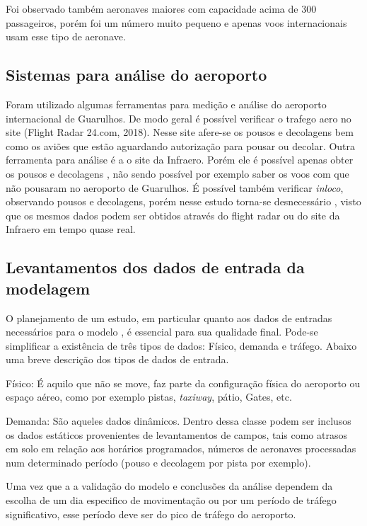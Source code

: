 \documentclass[12pt]{article}
\begin{document}
  Foi observado também aeronaves maiores com capacidade acima de 300 passageiros, porém 
  foi um número muito pequeno e apenas voos internacionais usam esse tipo de aeronave.
  
  \subsection{Sistemas para análise do aeroporto}
  
  Foram utilizado algumas ferramentas para medição e análise do aeroporto 
  internacional de Guarulhos. De modo geral é possível verificar o trafego
  aero no site (Flight Radar 24.com, 2018). Nesse site afere-se os pousos 
  e decolagens bem como os aviões que estão aguardando autorização para pousar
  ou decolar. Outra ferramenta para análise é a o site da Infraero. Porém 
  ele é possível apenas obter os pousos e decolagens , não sendo possível
  por exemplo saber os voos com que não pousaram no aeroporto de Guarulhos.
  É possível também verificar \textit{inloco}, observando pousos e decolagens, porém
  nesse estudo torna-se desnecessário , visto que os mesmos dados podem ser
  obtidos através do flight radar ou do site da Infraero em tempo quase
  real.
  
  \subsection{Levantamentos dos dados de entrada da modelagem}
  
  O planejamento de um estudo, em particular quanto aos dados de entradas
  necessários para o modelo , é essencial para sua qualidade final. Pode-se
  simplificar a existência de três tipos de dados: Físico, demanda e tráfego. 
  Abaixo uma breve descrição dos tipos de dados de entrada.
  
  Físico: É aquilo que não se move, faz parte da configuração física do 
  aeroporto ou espaço aéreo, como por exemplo pistas, \textit{taxiway}, pátio, Gates, etc.
  
  Demanda: São aqueles dados dinâmicos. Dentro dessa classe podem ser inclusos os 
  dados estáticos provenientes de levantamentos de campos, tais como
  atrasos em solo em relação aos horários programados, números de aeronaves
  processadas num determinado período (pouso e decolagem por pista por 
  exemplo).
  
  Uma vez que a a validação do modelo e conclusões da análise dependem da
  escolha de um dia especifico de movimentação ou por um período de tráfego
  significativo, esse período deve ser do pico de tráfego do aeroporto.
  
\end{document}
